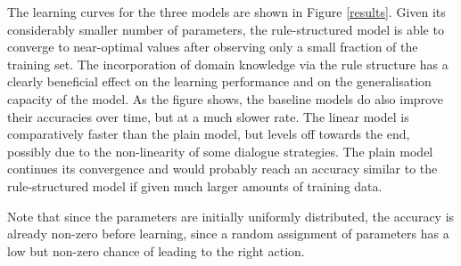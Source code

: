 The learning curves for the three models are shown in Figure \ref{results}.   Given its considerably smaller number of parameters, the rule-structured model is able to converge to near-optimal values after observing only a small fraction of the training set.  The incorporation of domain knowledge via the rule structure has a clearly beneficial effect on the learning performance and on the generalisation capacity of the model.  As the figure shows, the baseline models do also improve their accuracies over time, but at a much slower rate.   The linear model is comparatively faster than the plain model, but levels off towards the end, possibly due to the non-linearity of some dialogue strategies.  The plain model continues its convergence and would probably reach an accuracy similar to the rule-structured model if given much larger amounts of training data. 

Note that since the parameters are initially uniformly distributed, the accuracy is already non-zero before learning, since a random assignment of parameters has a low but non-zero chance of leading to the right action.


